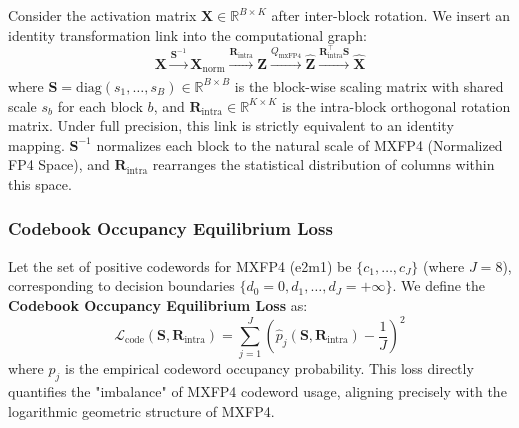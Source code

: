 Consider the activation matrix $\mathbf{X} \in \mathbb{R}^{B \times K}$ after inter-block rotation. We insert an identity transformation link into the computational graph:
\begin{equation}
\mathbf{X} \xrightarrow[]{\mathbf{S}^{-1}} \mathbf{X}_{\text{norm}} \xrightarrow[]{\mathbf{R}_{\text{intra}}} \mathbf{Z} \xrightarrow[]{Q_{\text{mxFP4}}} \hat{\mathbf{Z}} \xrightarrow[]{\mathbf{R}_{\text{intra}}^\top \mathbf{S}} \hat{\mathbf{X}}
\end{equation}
where $\mathbf{S} = \mathrm{diag}(s_1, \dots, s_B) \in \mathbb{R}^{B \times B}$ is the block-wise scaling matrix with shared scale $s_b$ for each block $b$, and $\mathbf{R}_{\text{intra}} \in \mathbb{R}^{K \times K}$ is the intra-block orthogonal rotation matrix. Under full precision, this link is strictly equivalent to an identity mapping. $\mathbf{S}^{-1}$ normalizes each block to the natural scale of MXFP4 (Normalized FP4 Space), and $\mathbf{R}_{\text{intra}}$ rearranges the statistical distribution of columns within this space.

\subsubsection{Codebook Occupancy Equilibrium Loss}

Let the set of positive codewords for MXFP4 (e2m1) be $\{c_1, \dots, c_J\}$ (where $J=8$), corresponding to decision boundaries $\{d_0=0, d_1, \dots, d_J=+\infty\}$. We define the \textbf{Codebook Occupancy Equilibrium Loss} as:
\begin{equation}
\mathcal{L}_{\text{code}}(\mathbf{S}, \mathbf{R}_{\text{intra}}) = \sum_{j=1}^{J} \left( \hat{p}_j(\mathbf{S}, \mathbf{R}_{\text{intra}}) - \frac{1}{J} \right)^2
\end{equation}
where $\hat{p}_j$ is the empirical codeword occupancy probability. This loss directly quantifies the "imbalance" of MXFP4 codeword usage, aligning precisely with the logarithmic geometric structure of MXFP4.

